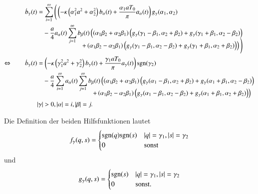 \begin{align}
\dot{b}_\gamma(t)
&=
\sum_{i = 1}^{\infty}
\Bigg(
\left(
-
\kappa
\left(\alpha_1^2 a^2 + \alpha_2^2\right)
b_{\alpha}(t)
+
\frac{\alpha_1 a T_0}{\pi}
a_{\alpha}(t)
\right)
g_\gamma(\alpha_1, \alpha_2) 
\nonumber
\\
&\phantom{={}}
-
\frac{a}{4}
a_{\alpha}(t)
\sum_{j = 1}^{\infty}
b_{\beta}(t)
\left(
\left(\alpha_1 \beta_2 + \alpha_2 \beta_1 \right)
\left(
g_\gamma(\gamma_1 - \beta_1, \alpha_2 + \beta_2)
+
g_\gamma(\gamma_1 + \beta_1, \alpha_2 - \beta_2)
\right)
\right. \nonumber
\\[-3ex]
&\phantom{=-aat\sum\sum...{}}
\left.
+
\left(\alpha_1 \beta_2 - \alpha_2 \beta_1 \right)
\left(
g_\gamma(\gamma_1 - \beta_1, \alpha_2 - \beta_2)
+
g_\gamma(\gamma_1 + \beta_1, \alpha_2 + \beta_2)
\right)
\right)
\Bigg) \nonumber
\\
\Leftrightarrow \qquad
\dot{b}_\gamma(t)
&=
\left(
-
\kappa
\left(\gamma_1^2 a^2 + \gamma_2^2\right)
b_{\gamma}(t)
+
\frac{\gamma_1 a T_0}{\pi}
a_{\gamma}(t)
\right)
\sgn(\gamma_2) \nonumber
\\
&\phantom{={}}
-
\frac{a}{4}
\sum_{i = 1}^{\infty}
a_{\alpha}(t)
\sum_{j = 1}^{\infty}
b_{\beta}(t)
\left(
\left(\alpha_1 \beta_2 + \alpha_2 \beta_1 \right)
\left(
g_\gamma(\alpha_1 - \beta_1, \alpha_2 + \beta_2)
+
g_\gamma(\alpha_1 + \beta_1, \alpha_2 - \beta_2)
\right)
\right.\nonumber
\\[-2ex]
&\phantom{=-aat\sum..a..\sum...{}}
\left.
+
\left(\alpha_1 \beta_2 - \alpha_2 \beta_1 \right)
\left(
g_\gamma(\alpha_1 - \beta_1, \alpha_2 - \beta_2)
+
g_\gamma(\alpha_1 + \beta_1, \alpha_2 + \beta_2)
\right)
\right)
\label{equation:lorenz2:dotb}
\\
&|\gamma| > 0, |\alpha| = i, |\beta| = j.\nonumber
\end{align}

Die Definition der beiden Hilfsfunktionen lautet
\begin{equation*}
f_\gamma(q, s)
=
\begin{cases}
\sgn(q)\sgn(s) & |q| = \gamma_1, |s| = \gamma_2 \\
0 & \text{sonst}
\end{cases}
\end{equation*}
und
\begin{equation*}
g_\gamma(q, s)
=
\begin{cases}
\sgn(s) & |q| = \gamma_1, |s| = \gamma_2 \\
0 & \text{sonst}.
\end{cases}
\end{equation*}
